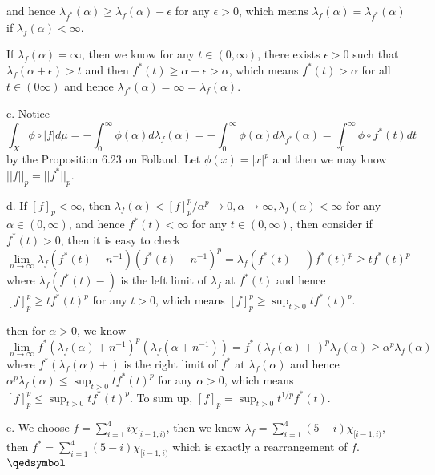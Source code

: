 \documentclass[lang=en,11pt,a4paper,citestyle =authoryear]{elegantpaper}
\newcommand{\prvd}{$\hfill \qedsymbol$}
\begin{document}
and hence $\lambda_{f^*}(\alpha) \geq \lambda_f(\alpha)-\epsilon$ for any $\epsilon > 0$, which means $\lambda_f(\alpha) = \lambda_{f^*}(\alpha)$ if $\lambda_f(\alpha) < \infty$.\par
If $\lambda_f(\alpha) = \infty$, then we know for any $t\in(0,\infty)$, there exists $\epsilon > 0$ such that $\lambda_f(\alpha+\epsilon) > t$ and then $f^*(t) \geq \alpha+\epsilon > \alpha$, which means $f^*(t) > \alpha$ for all $t\in(0\infty)$ and hence $\lambda_{f^*}(\alpha) = \infty = \lambda_{f}(\alpha)$.\par
c. Notice
\[ \int_X \phi\circ |f| d\mu = - \int_0^{\infty} \phi(\alpha)d\lambda_f(\alpha) = -\int_0^{\infty} \phi(\alpha) d\lambda_{f^*}(\alpha) = \int_0^{\infty} \phi \circ f^*(t) dt\]
by the Proposition 6.23 on Folland. Let $\phi(x) = |x|^p$ and then we may know $||f||_p = ||f^*||_p$.\par
d. If $[f]_p < \infty$, then $\lambda_f(\alpha) < [f]_p^p/\alpha^p \to 0, \alpha\to\infty,\lambda_f(\alpha)<\infty$ for any $\alpha \in (0,\infty)$, and hence $f^*(t) < \infty$ for any $t\in(0,\infty)$, then consider if $f^*(t)>0$, then it is easy to check
\[
\lim_{n\to\infty} \lambda_f(f^*(t)-n^{-1})(f^*(t) - n^{-1})^p = \lambda_f(f^*(t)-)f^*(t)^p \geq tf^*(t)^p
\]
where $\lambda_f(f^*(t)-)$ is the left limit of $\lambda_f$ at $f^*(t)$ and hence $[f]_p^p \geq tf^*(t)^p$ for any $t>0$, which means $[f]_p^p \geq \sup_{t>0} tf^*(t)^p$.\par
then for $\alpha > 0$, we know
\[
\lim_{n\to\infty} f^*(\lambda_f(\alpha)+n^{-1})^p(\lambda_f(\alpha+n^{-1})) = f^*(\lambda_f(\alpha)+)^p\lambda_f(\alpha) \geq \alpha^p\lambda_f(\alpha)
\]
where $f^*(\lambda_f(\alpha)+)$ is the right limit of $f^*$ at $\lambda_f(\alpha)$ and hence  $\alpha^p\lambda_f(\alpha) \leq \sup_{t>0} tf^*(t)^p$ for any $\alpha>0$, which means $[f]_p^p \leq \sup_{t>0} tf^*(t)^p$. To sum up, $[f]_p = \sup_{t>0} t^{1/p}f^*(t)$.\par
e. We choose $f = \sum\limits_{i=1}^4 i\chi_{[i-1,i)}$, then we know $\lambda_f = \sum\limits_{i=1}^4 (5-i)\chi_{[i-1,i)}$, then $f^* = \sum\limits_{i=1}^4 (5-i)\chi_{[i-1,i)}$ which is exactly a rearrangement of $f$.
\prvd
\vspace{0.5em}
\end{document}
